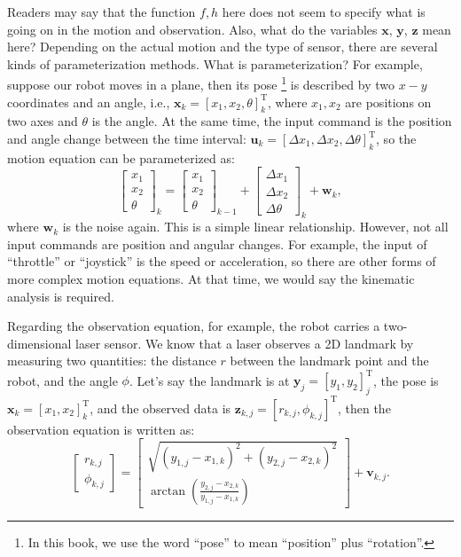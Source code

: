 Readers may say that the function $f,h$ here does not seem to specify what is going on in the motion and observation. Also, what do the variables $\mathbf{x}$, $\mathbf{y}$, $\mathbf{z}$ mean here? Depending on the actual motion and the type of sensor, there are several kinds of parameterization methods. What is parameterization? For example, suppose our robot moves in a plane, then its pose \footnote{ In this book, we use the word ``pose'' to mean ``position'' plus ``rotation''. } is described by two $x-y$ coordinates and an angle, i.e.,  $\mathbf{x}_k = [x_1,x_2,\theta]_k^\mathrm{T}$, where $x_1, x_2$ are positions on two axes and $\theta$ is the angle. At the same time, the input command is the position and angle change between the time interval: $\mathbf{u}_k = [ \Delta x_1, \Delta x_2, \Delta \theta ]_k^\mathrm{T} $, so the motion equation can be parameterized as:
\begin{equation}
{\left[ \begin{array}{l}
    x_1\\
    x_2\\
    \theta
    \end{array} \right]_k} = {\left[ \begin{array}{l}
    x_1\\
    x_2\\
    \theta
    \end{array} \right]_{k - 1}} + {\left[ \begin{array}{l}
    \Delta x_1\\
    \Delta x_2\\
    \Delta \theta
    \end{array} \right]_k} + {\mathbf{w}_k},
\end{equation}
where $\mathbf{w}_k$ is the noise again. This is a simple linear relationship. However, not all input commands are position and angular changes. For example, the input of ``throttle'' or ``joystick'' is the speed or acceleration, so there are other forms of more complex motion equations. At that time, we would say the kinematic analysis is required.

Regarding the observation equation, for example, the robot carries a two-dimensional laser sensor. We know that a laser observes a 2D landmark by measuring two quantities: the distance $r$ between the landmark point and the robot, and the angle $\phi$. Let's say the landmark is at $\mathbf{y}_j = [y_1, y_2]_j^\mathrm{T}$, the pose is $\mathbf{x}_k=[x_1,x_2]_k^\mathrm{T}$, and the observed data is $\mathbf{z}_{k,j} = [r_{k,j}, \phi_{k,j}]^\mathrm{T}$, then the observation equation is written as:
\begin{equation}
\left[ \begin{array}{l}
r_{k,j}\\
\phi_{k,j}
\end{array} \right] = \left[ \begin{array}{l}
\sqrt {{{\left(y_{1,j} - x_{1,k} \right)}^2} + {{\left( {{y_{2,j}} - x_{2,k} } \right)}^2}} \\
\arctan \left( \frac{{y_{2,j}} - x_{2,k}}{{y_{1,j} - x_{1,k}}} \right)
\end{array} \right] + \mathbf{v}_{k, j}.
\end{equation}

